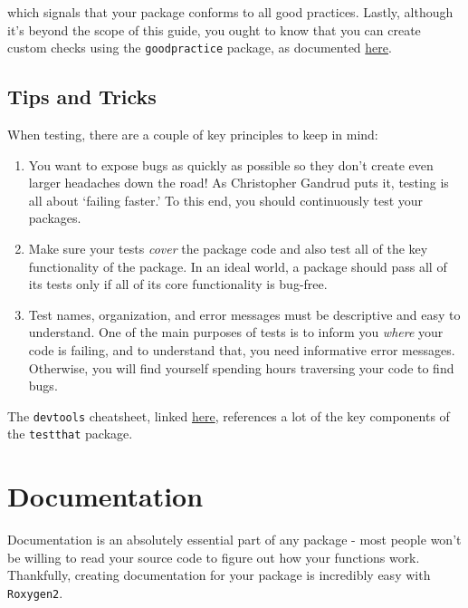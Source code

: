 \documentclass[
]{book}
\providecommand{\tightlist}{%
  \setlength{\itemsep}{0pt}\setlength{\parskip}{0pt}}
\begin{document}
which signals that your package conforms to all good practices. Lastly, although it's beyond the scope of this guide, you ought to know that you can create custom checks using the \texttt{goodpractice} package, as documented \href{https://github.com/MangoTheCat/goodpractice/blob/master/vignettes/custom_checks.Rmd}{here}.

\hypertarget{tips-and-tricks}{%
\subsection{Tips and Tricks}\label{tips-and-tricks}}

When testing, there are a couple of key principles to keep in mind:

\begin{enumerate}
\def\labelenumi{\arabic{enumi}.}
\tightlist
\item
  You want to expose bugs as quickly as possible so they don't create even larger headaches down the road! As Christopher Gandrud puts it, testing is all about `failing faster.' To this end, you should continuously test your packages.
\item
  Make sure your tests \emph{cover} the package code and also test all of the key functionality of the package. In an ideal world, a package should pass all of its tests only if all of its core functionality is bug-free.
\item
  Test names, organization, and error messages must be descriptive and easy to understand. One of the main purposes of tests is to inform you \emph{where} your code is failing, and to understand that, you need informative error messages. Otherwise, you will find yourself spending hours traversing your code to find bugs.
\end{enumerate}

The \texttt{devtools} cheatsheet, linked \href{https://www.rstudio.com/wp-content/uploads/2015/03/devtools-cheatsheet.pdf}{here}, references a lot of the key components of the \texttt{testthat} package.

\hypertarget{documentation}{%
\section{Documentation}\label{documentation}}

Documentation is an absolutely essential part of any package - most people won't be willing to read your source code to figure out how your functions work. Thankfully, creating documentation for your package is incredibly easy with \texttt{Roxygen2}.
\end{document}
